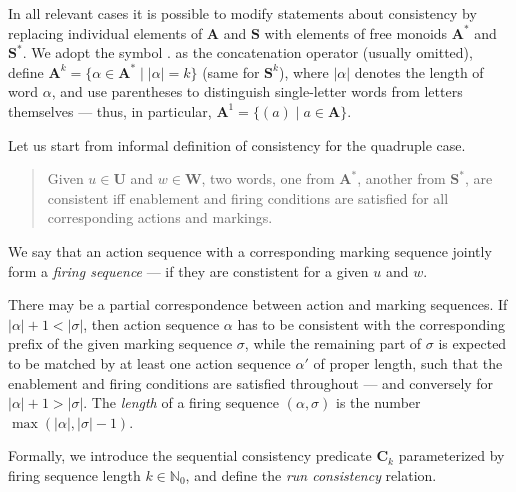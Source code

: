 \documentclass [a4paper,12pt] {article}
\theoremstyle{definition}
\begin{document}
In all relevant cases it is possible to modify statements about
consistency by replacing individual elements of $\mathbf {A}$ and
$\mathbf {S}$ with elements of free monoids $\mathbf {A}^{\!\ast}$ and
$\mathbf {S}^\ast$.  We adopt the symbol $.$ as the concatenation
operator (usually omitted), define $\mathbf {A}^{\!k} = \{ \alpha \in
\mathbf {A}^{\!\ast} \;|\; |\alpha| = k \}$ (same for $\mathbf
        {S}^k$), where $|\alpha|$ denotes the length of word $\alpha$,
        and use parentheses to distinguish single-letter words from
        letters themselves --- thus, in particular, $\mathbf {A}^{\!1}
        = \{ (a) \;|\; a \in \mathbf {A} \}$.

Let us start from informal definition of consistency for the quadruple
case.

\begin {quote}
    Given $u \in \mathbf {U}$ and $w \in \mathbf {W}$, two words, one
    from $\mathbf {A}^{\!\ast}$, another from $\mathbf {S}^\ast$, are
    consistent iff enablement and firing conditions are satisfied for
    all corresponding actions and markings.
\end {quote}

\noindent
We say that an action sequence with a corresponding marking sequence
jointly form a {\em firing sequence}\/ --- if they are constistent for
a given $u$ and $w$.

There may be a partial correspondence between action and marking
sequences.  If $|\alpha| + 1 < |\sigma|$, then action sequence
$\alpha$ has to be consistent with the corresponding prefix of the
given marking sequence $\sigma$, while the remaining part of $\sigma$
is expected to be matched by at least one action sequence $\alpha'$ of
proper length, such that the enablement and firing conditions are
satisfied throughout --- and conversely for $|\alpha| + 1 > |\sigma|$.
The {\em length}\/ of a firing sequence $(\alpha, \sigma)$ is the
number $\max (|\alpha|, |\sigma| - 1)$.

Formally, we introduce the sequential consistency predicate $\bm
{C}_k$ parameterized by firing sequence length $k \in \mathbb {N}_0$,
and define the {\em run consistency}\/ relation.
\end{document}
